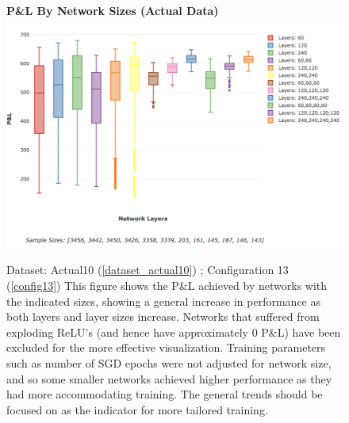 \documentclass[a4paper,11pt,oneside]{article}
\theoremstyle{plain}
\theoremstyle{definition}
\begin{document}
	\begin{figure}[H]
		\centering 
		\textbf{P\&L By Network Sizes (Actual Data)}
		\includegraphics[scale=0.3]{images/results/network/actual_pl_box.png} 
		\caption[P\&L By Network Sizes (Actual Data)]{Dataset: Actual10 (\ref{dataset_actual10}) ; Configuration 13 (\ref{config13})
			\newline This figure shows the P\&L achieved by networks with the indicated sizes, showing a general increase in performance as both layers and layer sizes increase. Networks that suffered from exploding ReLU's (and hence have approximately 0 P\&L) have been excluded for the more effective visualization. Training parameters such as number of SGD epochs were not adjusted for network size, and so some smaller networks achieved higher performance as they had more accommodating training. The general trends should be focused on as the indicator for more tailored training.}
		\label{figure-results_actual_pl_box}
	\end{figure}
	
\end{document}
